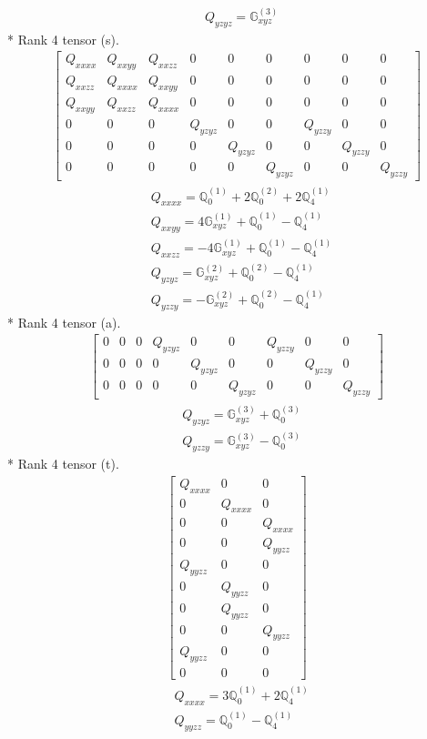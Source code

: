 \documentclass[fleqn,8pt,landscape]{jsarticle}
\begin{document}
\begin{align*}
& Q_{yzyz} = \mathbb{G}_{xyz}^{(3)}
\end{align*}
* Rank 4 tensor (s).
\begin{align*}
\begin{bmatrix} Q_{xxxx} & Q_{xxyy} & Q_{xxzz} & 0 & 0 & 0 & 0 & 0 & 0 \\ Q_{xxzz} & Q_{xxxx} & Q_{xxyy} & 0 & 0 & 0 & 0 & 0 & 0 \\ Q_{xxyy} & Q_{xxzz} & Q_{xxxx} & 0 & 0 & 0 & 0 & 0 & 0 \\ 0 & 0 & 0 & Q_{yzyz} & 0 & 0 & Q_{yzzy} & 0 & 0 \\ 0 & 0 & 0 & 0 & Q_{yzyz} & 0 & 0 & Q_{yzzy} & 0 \\ 0 & 0 & 0 & 0 & 0 & Q_{yzyz} & 0 & 0 & Q_{yzzy} \end{bmatrix}
\end{align*}
\begin{align*}
& Q_{xxxx} = \mathbb{Q}_{0}^{(1)} + 2 \mathbb{Q}_{0}^{(2)} + 2 \mathbb{Q}_{4}^{(1)} \\
& Q_{xxyy} = 4 \mathbb{G}_{xyz}^{(1)} + \mathbb{Q}_{0}^{(1)} - \mathbb{Q}_{4}^{(1)} \\
& Q_{xxzz} = - 4 \mathbb{G}_{xyz}^{(1)} + \mathbb{Q}_{0}^{(1)} - \mathbb{Q}_{4}^{(1)} \\
& Q_{yzyz} = \mathbb{G}_{xyz}^{(2)} + \mathbb{Q}_{0}^{(2)} - \mathbb{Q}_{4}^{(1)} \\
& Q_{yzzy} = - \mathbb{G}_{xyz}^{(2)} + \mathbb{Q}_{0}^{(2)} - \mathbb{Q}_{4}^{(1)}
\end{align*}
* Rank 4 tensor (a).
\begin{align*}
\begin{bmatrix} 0 & 0 & 0 & Q_{yzyz} & 0 & 0 & Q_{yzzy} & 0 & 0 \\ 0 & 0 & 0 & 0 & Q_{yzyz} & 0 & 0 & Q_{yzzy} & 0 \\ 0 & 0 & 0 & 0 & 0 & Q_{yzyz} & 0 & 0 & Q_{yzzy} \end{bmatrix}
\end{align*}
\begin{align*}
& Q_{yzyz} = \mathbb{G}_{xyz}^{(3)} + \mathbb{Q}_{0}^{(3)} \\
& Q_{yzzy} = \mathbb{G}_{xyz}^{(3)} - \mathbb{Q}_{0}^{(3)}
\end{align*}
* Rank 4 tensor (t).
\begin{align*}
\begin{bmatrix} Q_{xxxx} & 0 & 0 \\ 0 & Q_{xxxx} & 0 \\ 0 & 0 & Q_{xxxx} \\ 0 & 0 & Q_{yyzz} \\ Q_{yyzz} & 0 & 0 \\ 0 & Q_{yyzz} & 0 \\ 0 & Q_{yyzz} & 0 \\ 0 & 0 & Q_{yyzz} \\ Q_{yyzz} & 0 & 0 \\ 0 & 0 & 0 \end{bmatrix}
\end{align*}
\begin{align*}
& Q_{xxxx} = 3 \mathbb{Q}_{0}^{(1)} + 2 \mathbb{Q}_{4}^{(1)} \\
& Q_{yyzz} = \mathbb{Q}_{0}^{(1)} - \mathbb{Q}_{4}^{(1)}
\end{align*}
\end{document}
